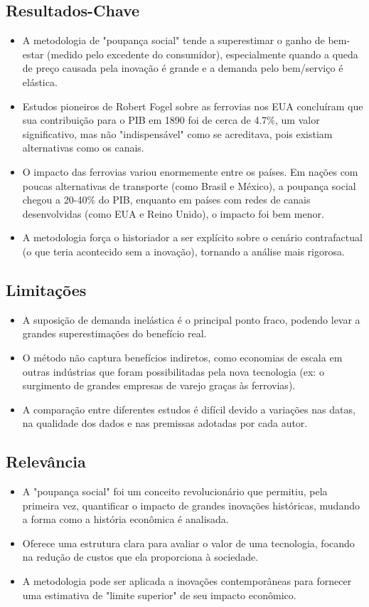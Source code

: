 \documentclass[12pt]{article}
\begin{document}
\subsection*{Resultados-Chave}
\begin{itemize}
    \item A metodologia de "poupança social" tende a superestimar o ganho de bem-estar (medido pelo excedente do consumidor), especialmente quando a queda de preço causada pela inovação é grande e a demanda pelo bem/serviço é elástica.
    \item Estudos pioneiros de Robert Fogel sobre as ferrovias nos EUA concluíram que sua contribuição para o PIB em 1890 foi de cerca de 4.7\%, um valor significativo, mas não "indispensável" como se acreditava, pois existiam alternativas como os canais.
    \item O impacto das ferrovias variou enormemente entre os países. Em nações com poucas alternativas de transporte (como Brasil e México), a poupança social chegou a 20-40\% do PIB, enquanto em países com redes de canais desenvolvidas (como EUA e Reino Unido), o impacto foi bem menor.
    \item A metodologia força o historiador a ser explícito sobre o cenário contrafactual (o que teria acontecido sem a inovação), tornando a análise mais rigorosa.
\end{itemize}

\subsection*{Limitações}
\begin{itemize}
    \item A suposição de demanda inelástica é o principal ponto fraco, podendo levar a grandes superestimações do benefício real.
    \item O método não captura benefícios indiretos, como economias de escala em outras indústrias que foram possibilitadas pela nova tecnologia (ex: o surgimento de grandes empresas de varejo graças às ferrovias).
    \item A comparação entre diferentes estudos é difícil devido a variações nas datas, na qualidade dos dados e nas premissas adotadas por cada autor.
\end{itemize}

\subsection*{Relevância}
\begin{itemize}
    \item A "poupança social" foi um conceito revolucionário que permitiu, pela primeira vez, quantificar o impacto de grandes inovações históricas, mudando a forma como a história econômica é analisada.
    \item Oferece uma estrutura clara para avaliar o valor de uma tecnologia, focando na redução de custos que ela proporciona à sociedade.
    \item A metodologia pode ser aplicada a inovações contemporâneas para fornecer uma estimativa de "limite superior" de seu impacto econômico.
\end{itemize}
\end{document}
